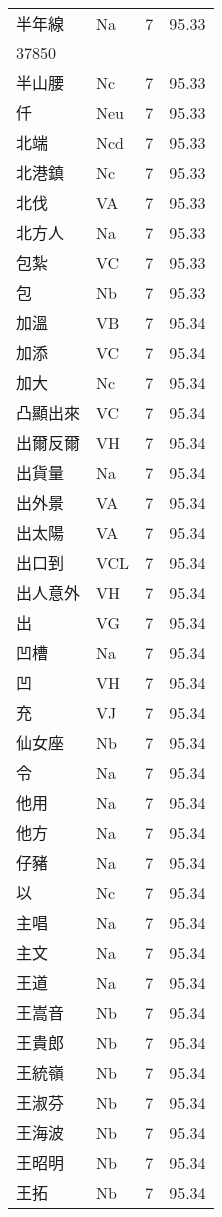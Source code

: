 \documentclass[twocolumn]{book}
\begin{document}
\begin{supertabular}{llrr}
半年線 & Na & 7 &  95.33\\
37850\\
半山腰 & Nc & 7 &  95.33\\
仟 & Neu & 7 &  95.33\\
北端 & Ncd & 7 &  95.33\\
北港鎮 & Nc & 7 &  95.33\\
北伐 & VA & 7 &  95.33\\
北方人 & Na & 7 &  95.33\\
包紮 & VC & 7 &  95.33\\
包 & Nb & 7 &  95.33\\
加溫 & VB & 7 &  95.34\\
加添 & VC & 7 &  95.34\\
加大 & Nc & 7 &  95.34\\
凸顯出來 & VC & 7 &  95.34\\
出爾反爾 & VH & 7 &  95.34\\
出貨量 & Na & 7 &  95.34\\
出外景 & VA & 7 &  95.34\\
出太陽 & VA & 7 &  95.34\\
出口到 & VCL & 7 &  95.34\\
出人意外 & VH & 7 &  95.34\\
出 & VG & 7 &  95.34\\
凹槽 & Na & 7 &  95.34\\
凹 & VH & 7 &  95.34\\
充 & VJ & 7 &  95.34\\
仙女座 & Nb & 7 &  95.34\\
令 & Na & 7 &  95.34\\
他用 & Na & 7 &  95.34\\
他方 & Na & 7 &  95.34\\
仔豬 & Na & 7 &  95.34\\
以 & Nc & 7 &  95.34\\
主唱 & Na & 7 &  95.34\\
主文 & Na & 7 &  95.34\\
王道 & Na & 7 &  95.34\\
王嵩音 & Nb & 7 &  95.34\\
王貴郎 & Nb & 7 &  95.34\\
王統嶺 & Nb & 7 &  95.34\\
王淑芬 & Nb & 7 &  95.34\\
王海波 & Nb & 7 &  95.34\\
王昭明 & Nb & 7 &  95.34\\
王拓 & Nb & 7 &  95.34\\

\end{supertabular}
\end{document}
